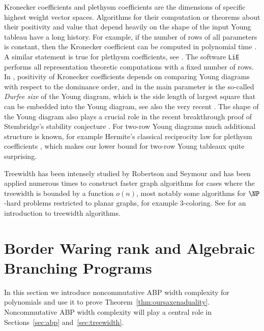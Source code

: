 Kronecker coefficients and plethysm coefficients are the dimensions of specific highest weight vector spaces.
Algorithms for their computation or theorems about their positivity and value that depend heavily on the shape of the input Young tableau have a long history.
For example, if the number of rows of all parameters is constant, then the Kronecker coefficient can be computed in polynomial time \cite{CDW:12}.
A similar statement is true for plethysm coefficients, see \cite{FI:20}.
The software \texttt{LiE} \cite{LiE} performs all representation theoretic computations with a fixed number of rows.
In \cite{Ike:15}, positivity of Kronecker coefficients depends on comparing Young diagrams with respect to the dominance order, and in \cite{BB:04} the main parameter is the so-called \emph{Durfee size} of the Young diagram, which is the side length of largest square that can be embedded into the Young diagram, see also the very recent \cite{BBP:20}.
The shape of the Young diagram also plays a crucial role in the recent breakthrough proof of Stembridge's stability conjecture \cite{SS:16}.
For two-row Young diagrams much additional structure is known, for example Hermite's classical reciprocity law for plethysm coefficients \cite{Her:54}, which makes our lower bound for two-row Young tableaux quite surprising.

Treewidth has been intensely studied by Robertson and Seymour and has been applied numerous times to construct faster graph algorithms for cases where the treewidth is bounded by a function $o(n)$, most notably some algorithms for $\NP$-hard problems restricted to planar graphs, for example $3$-coloring.
See \cite{cygan2015parameterized} for an introduction to treewidth algorithms.






\section{Border Waring rank and Algebraic Branching Programs}\label{sec:prelude}
In this section we introduce noncommutative ABP width complexity for polynomials and use it to prove Theorem~\ref{thm:oursaxenaduality}.
Noncommutative ABP width complexity will play a central role in Sections~\ref{sec:abp} and~\ref{sec:treewidth}.

